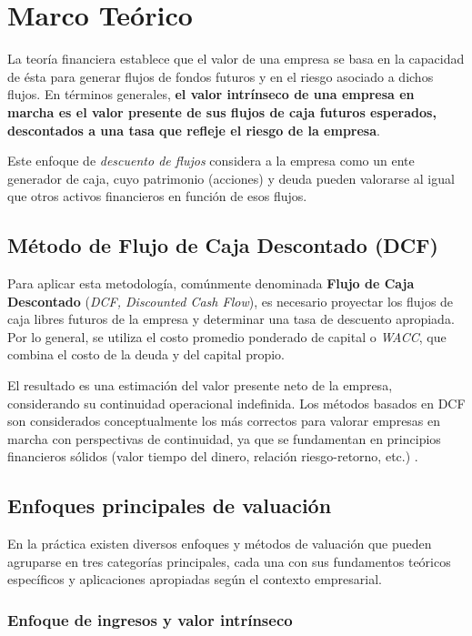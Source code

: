\chapter{Marco Teórico}

La teoría financiera establece que el valor de una empresa se basa en la capacidad de ésta para generar flujos de fondos futuros y en el riesgo asociado a dichos flujos. En términos generales, \textbf{el valor intrínseco de una empresa en marcha es el valor presente de sus flujos de caja futuros esperados, descontados a una tasa que refleje el riesgo de la empresa}.

Este enfoque de \emph{descuento de flujos} considera a la empresa como un ente generador de caja, cuyo patrimonio (acciones) y deuda pueden valorarse al igual que otros activos financieros en función de esos flujos.

\section{Método de Flujo de Caja Descontado (DCF)}

Para aplicar esta metodología, comúnmente denominada \textbf{Flujo de Caja Descontado} (\emph{DCF, Discounted Cash Flow}), es necesario proyectar los flujos de caja libres futuros de la empresa y determinar una tasa de descuento apropiada. Por lo general, se utiliza el costo promedio ponderado de capital o \emph{WACC}, que combina el costo de la deuda y del capital propio.

El resultado es una estimación del valor presente neto de la empresa, considerando su continuidad operacional indefinida. Los métodos basados en DCF son considerados conceptualmente los más correctos para valorar empresas en marcha con perspectivas de continuidad, ya que se fundamentan en principios financieros sólidos (valor tiempo del dinero, relación riesgo-retorno, etc.) \citep{copeland2014,damodaran2012}.

\section{Enfoques principales de valuación}

En la práctica existen diversos enfoques y métodos de valuación que pueden agruparse en tres categorías principales, cada una con sus fundamentos teóricos específicos y aplicaciones apropiadas según el contexto empresarial.

\subsection{Enfoque de ingresos y valor intrínseco}

